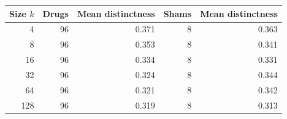\begin{tabular}{@{}rrrrr@{}}\toprule Size $k$ & Drugs & Mean distinctness & Shams & Mean distinctness \\ \midrule
4 & 96 & 0.371 & 8 & 0.363 \\
8 & 96 & 0.353 & 8 & 0.341 \\
16 & 96 & 0.334 & 8 & 0.331 \\
32 & 96 & 0.324 & 8 & 0.344 \\
64 & 96 & 0.321 & 8 & 0.342 \\
128 & 96 & 0.319 & 8 & 0.313 \\
\bottomrule\end{tabular}
